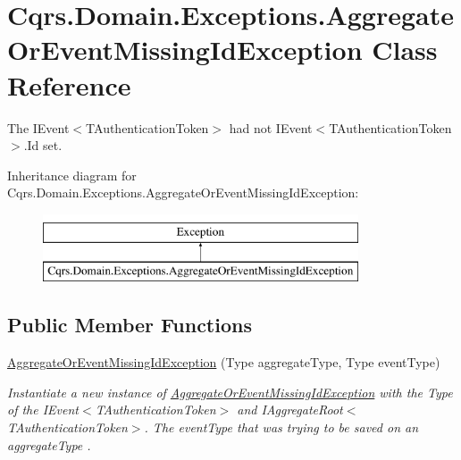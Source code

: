 \hypertarget{classCqrs_1_1Domain_1_1Exceptions_1_1AggregateOrEventMissingIdException}{}\section{Cqrs.\+Domain.\+Exceptions.\+Aggregate\+Or\+Event\+Missing\+Id\+Exception Class Reference}
\label{classCqrs_1_1Domain_1_1Exceptions_1_1AggregateOrEventMissingIdException}


The I\+Event$<$\+T\+Authentication\+Token$>$ had not I\+Event$<$\+T\+Authentication\+Token$>$.\+Id set.  


Inheritance diagram for Cqrs.\+Domain.\+Exceptions.\+Aggregate\+Or\+Event\+Missing\+Id\+Exception\+:\begin{figure}[H]
\begin{center}
\leavevmode
\includegraphics[height=2.000000cm]{classCqrs_1_1Domain_1_1Exceptions_1_1AggregateOrEventMissingIdException}
\end{center}
\end{figure}
\subsection*{Public Member Functions}
\begin{DoxyCompactItemize}
\item 
\hyperlink{classCqrs_1_1Domain_1_1Exceptions_1_1AggregateOrEventMissingIdException_ac63e413557df17ed490a8b787e17d960_ac63e413557df17ed490a8b787e17d960}{Aggregate\+Or\+Event\+Missing\+Id\+Exception} (Type aggregate\+Type, Type event\+Type)
\begin{DoxyCompactList}\small\item\em Instantiate a new instance of \hyperlink{classCqrs_1_1Domain_1_1Exceptions_1_1AggregateOrEventMissingIdException}{Aggregate\+Or\+Event\+Missing\+Id\+Exception} with the Type of the I\+Event$<$\+T\+Authentication\+Token$>$ and I\+Aggregate\+Root$<$\+T\+Authentication\+Token$>$. The {\itshape event\+Type}  that was trying to be saved on an {\itshape aggregate\+Type} . \end{DoxyCompactList}\end{DoxyCompactItemize}
